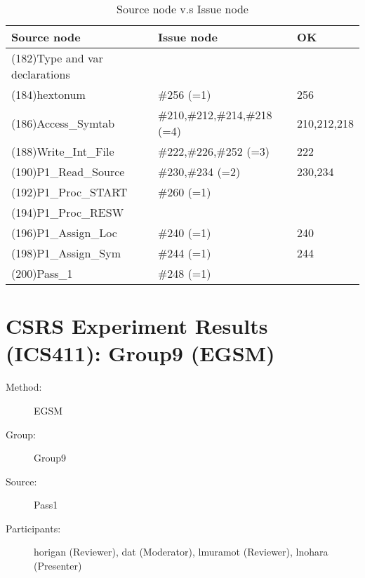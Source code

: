 \begin{table}[hb]
\begin{center}
\begin{tabular}{|l|l|l|}
\hline
Source node & Issue node & OK \\
\hline
(182)Type and var declarations &  & \\
(184)hextonum & \#256 (=1) & 256\\
(186)Access\_Symtab & \#210,\#212,\#214,\#218 (=4) & 210,212,218\\
(188)Write\_Int\_File & \#222,\#226,\#252 (=3) & 222\\
(190)P1\_Read\_Source & \#230,\#234 (=2) & 230,234\\
(192)P1\_Proc\_START & \#260 (=1) & \\
(194)P1\_Proc\_RESW &  & \\
(196)P1\_Assign\_Loc & \#240 (=1) & 240\\
(198)P1\_Assign\_Sym & \#244 (=1) & 244\\
(200)Pass\_1 & \#248 (=1) & \\
\hline
\end{tabular}
\caption{Source node v.s Issue node}
\end{center}
\end{table}

                                                                                                                                                                                                                                                                                                                  %
\chapter {CSRS Experiment Results (ICS411): Group9 (EGSM)}
\small
	  

\begin{description}
\item [Method:] EGSM
\item [Group:] Group9
\item [Source:] Pass1
\item [Participants:] horigan (Reviewer), dat (Moderator), lmuramot (Reviewer), lnohara (Presenter)
\end{description}
